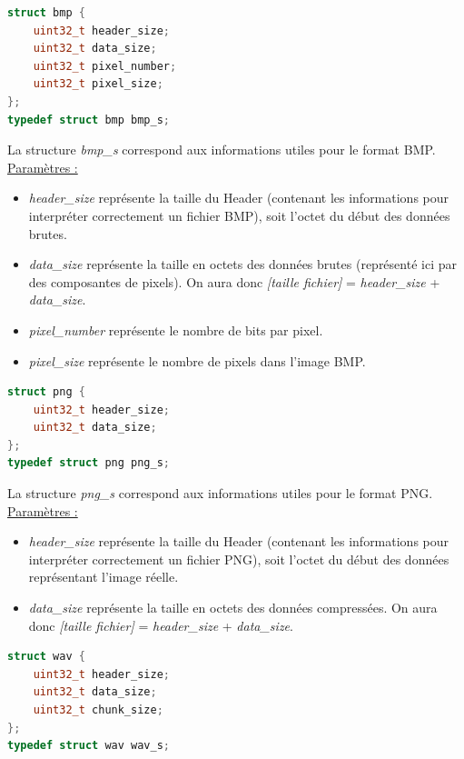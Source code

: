 \documentclass[11pt]{article}
\begin{document}
\begin{lstlisting}[language=c]
struct bmp {
	uint32_t header_size;
	uint32_t data_size;
	uint32_t pixel_number;
	uint32_t pixel_size;
};
typedef struct bmp bmp_s;
\end{lstlisting}

La structure \textit{bmp\_s} correspond aux informations 
utiles pour le format BMP.  
\newline
\underline{Paramètres :}
\begin{itemize}
\item \textit{header\_size} représente la taille du Header (contenant les 
informations pour interpréter correctement un fichier BMP), soit l'octet 
du début des données brutes. 
\item \textit{data\_size} représente la taille en octets des données brutes 
(représenté ici par des composantes de pixels). On aura donc 
\textit{[taille fichier]} = \textit{header\_size} + \textit{data\_size}.
\item \textit{pixel\_number} représente le nombre de bits par pixel. 
\item \textit{pixel\_size} représente le nombre de pixels dans l'image BMP. 
\newline
\end{itemize}

\begin{lstlisting}[language=c]
struct png {
	uint32_t header_size;
	uint32_t data_size;
};
typedef struct png png_s;
\end{lstlisting}

La structure \textit{png\_s} correspond aux informations 
utiles pour le format PNG.  
\newline
\underline{Paramètres :}
\begin{itemize}
\item \textit{header\_size} représente la taille du Header (contenant les 
informations pour interpréter correctement un fichier PNG), soit l'octet 
du début des données représentant l'image réelle. 
\item \textit{data\_size} représente la taille en octets des données compressées. 
On aura donc 
\textit{[taille fichier]} = \textit{header\_size} + \textit{data\_size}.
\newline
\end{itemize}

\begin{lstlisting}[language=c]
struct wav {
	uint32_t header_size;
	uint32_t data_size;
	uint32_t chunk_size;
};
typedef struct wav wav_s;
\end{lstlisting}
\end{document}
